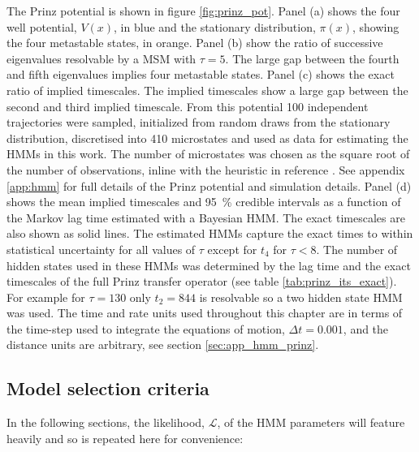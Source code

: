 The Prinz potential\cite{prinzMarkovModelsMolecular2011} is shown in figure \ref{fig:prinz_pot}.  Panel (a) shows the four well potential, $V(x)$, in blue and the stationary distribution, $\pi(x)$, showing the four metastable states, in orange. Panel (b) show the  ratio of successive eigenvalues resolvable by a  MSM with $\tau=5$. The large gap between the fourth and fifth eigenvalues implies four metastable states. Panel (c) shows the exact ratio of implied timescales. The implied timescales show a large gap between the second and third implied timescale. From this potential \num{100} independent trajectories were sampled, initialized from random draws from the stationary distribution, discretised into \num{410} microstates and used as data for estimating the HMMs in this work. The number of microstates was chosen as the square root of the number of observations, inline with the heuristic in reference \cite{husicWardClusteringImproves2017a}. See appendix \ref{app:hmm} for full details of the Prinz potential and simulation details. Panel (d) shows the mean implied timescales and \SI{95}{\percent} credible intervals as a function of the Markov lag time estimated with a Bayesian HMM. The exact timescales are also shown as solid lines. The estimated HMMs capture the exact times to within statistical uncertainty for all values of $\tau$ except for $t_{4}$ for $\tau < 8$. The number of hidden states used in these HMMs was determined by the lag time and the exact timescales of the full Prinz transfer operator (see table \ref{tab:prinz_its_exact}). For example for $\tau = 130$ only $t_2 = 844$ is resolvable so a two hidden state HMM was used. The time and rate units used throughout this chapter are in terms of the time-step used to integrate the equations of motion, $\Delta t = 0.001$, and the distance units are arbitrary, see section \ref{sec:app_hmm_prinz}.

\subsection{Model selection criteria}

In the following sections, the likelihood, $\mathcal{L}$, of the HMM parameters will feature heavily and so is repeated here for convenience\cite{noeProjectedHiddenMarkov2013a}: 

